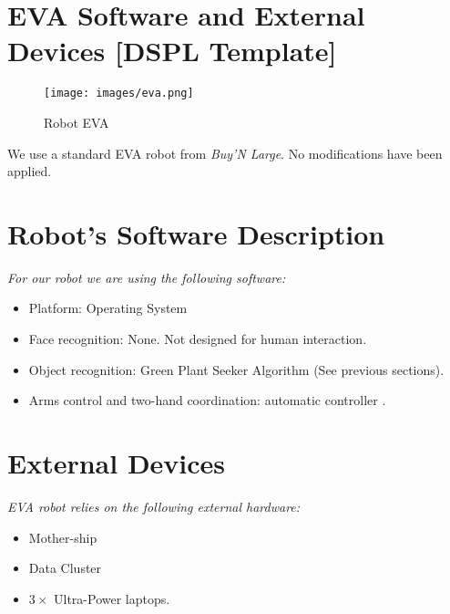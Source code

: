 \section*{EVA Software and External Devices [DSPL Template]}
\label{sec:annex-DSPL}

\setlength\intextsep{0pt}
\begin{wrapfigure}[10]{r}{0.3\textwidth}
	\centering
	\texttt{[image: images/eva.png]}
	\caption{Robot EVA}
	\label{fig:eva}
\end{wrapfigure}

We use a standard EVA robot from \textit{Buy'N Large}. No modifications have been applied.

\section*{Robot's Software Description}

\textit{For our robot we are using the following software:}

\begin{itemize}
	\item Platform: \BnL Operating System
	\item Face recognition: None. Not designed for human interaction.
	\item Object recognition: \BnL Green Plant Seeker Algorithm (See previous sections).
	\item Arms control and two-hand coordination: \BnL automatic controller \cite{bnl2}.
\end{itemize}

\section*{External Devices}

\textit{EVA robot relies on the following external hardware:}

\begin{itemize}
	\item \BnL Mother-ship
	\item \BnL Data Cluster
	\item $3 \times$ \BnL Ultra-Power laptops.
\end{itemize}

